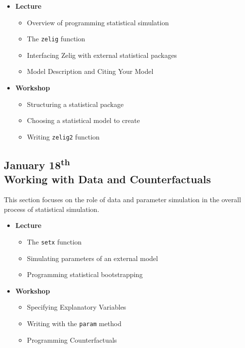 \documentclass{article}
\begin{document}
\begin{itemize}

	\item {\bf Lecture}
		\begin{itemize}
		  \item Overview of programming statistical simulation
			\item The {\tt zelig} function
		  \item Interfacing Zelig with external statistical packages
		  \item Model Description and Citing Your Model
		\end{itemize}
		
	\item {\bf Workshop}
		\begin{itemize}
			\item Structuring a statistical package
			\item Choosing a statistical model to create
			\item Writing {\tt zelig2} function
		\end{itemize}

\end{itemize}



\subsection{January 18\textsuperscript{th} \\ Working with Data and Counterfactuals}

This section focuses on the role of data and parameter simulation in the overall
process of statistical simulation.

\begin{itemize}

	\item {\bf Lecture}
		\begin{itemize}
		  \item The {\tt setx} function
		  \item Simulating parameters of an external model
		  \item Programming statistical bootstrapping
		\end{itemize}

	\item {\bf Workshop}
		\begin{itemize}
			\item Specifying Explanatory Variables
	    \item Writing with the {\tt param} method
		  \item Programming Counterfactuals
		\end{itemize}

\end{itemize}
\end{document}
